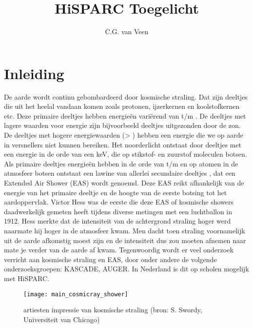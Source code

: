 

\usepackage{lipsum}

\title{HiSPARC Toegelicht} \author{C.G. van Veen} 



\maketitle

\section{Inleiding}

De aarde wordt continu gebombardeerd door kosmische straling. Dat zijn
deeltjes die uit het heelal vandaan komen zoals protonen, ijzerkernen en
koolstofkernen etc. Deze primaire deeltjes hebben energieën variërend
van  t/m  \electronvolt. De deeltjes met lagere
waarden voor energie zijn bijvoorbeeld deeltjes uitgezonden door de zon.
De deeltjes met hogere energiewaarden (> \electronvolt) hebben
een energie die we op aarde in versnellers niet kunnen bereiken. Het
noorderlicht ontstaat door deeltjes met een energie in de orde van een
keV, die op stikstof- en zuurstof moleculen botsen. Als primaire
deeltjes energieën hebben in de orde van  t/m 
\electronvolt en op atomen in de atmosfeer botsen ontstaat een lawine
van allerlei secundaire deeltjes , dat
een Extended Air Shower (EAS) wordt genoemd. Deze EAS reikt afhankelijk
van de energie van het primaire deeltje en de hoogte van de eerste
botsing tot het aardoppervlak. Victor Hess was de eerste die deze EAS of
kosmische showers daadwerkelijk gemeten heeft tijdens diverse metingen
met een luchtballon in 1912. Hess merkte dat de intensiteit van de
achtergrond straling hoger werd naarmate hij hoger in de atmosfeer kwam.
Men dacht toen straling voornamelijk uit de aarde afkomstig moest zijn
en de intensiteit dus zou moeten afnemen naar mate je verder van de
aarde af kwam. Tegenwoordig wordt er veel onderzoek verricht aan
kosmische straling en EAS, door onder andere de volgende
onderzoeksgroepen: KASCADE, AUGER. In Nederland is dit op scholen
mogelijk met HiSPARC.

\begin{figure} \centering
\texttt{[image: main\_cosmicray\_shower]} \caption{artiesten 
impressie van kosmische straling (bron: S. Swordy, Universiteit van
Chicago)} \label{fig:main_cosmicray_shower} \end{figure}

